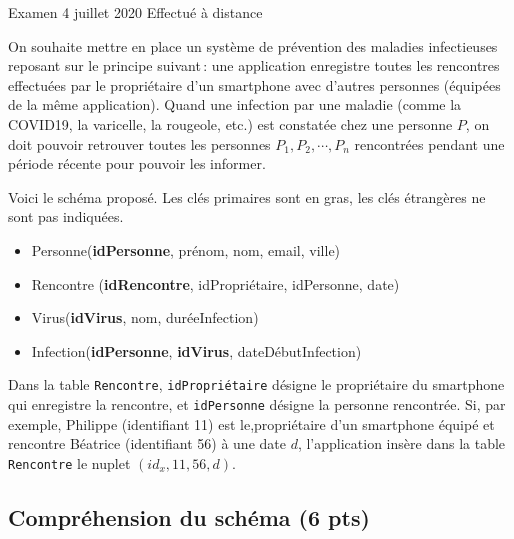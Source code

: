 %
{Examen 4 juillet 2020}%
{Effectué à distance}%

On souhaite mettre en place un système de prévention des maladies infectieuses
reposant sur le principe suivant\,: une application  
enregistre toutes les rencontres effectuées par le propriétaire
d'un smartphone avec d'autres personnes (équipées de la même application). 
Quand une infection par une maladie (comme la COVID19, la  varicelle, la rougeole, etc.)
est constatée chez une personne $P$, on doit pouvoir retrouver toutes  les
personnes $P_1, P_2, \cdots, P_n$ rencontrées pendant une période récente pour pouvoir
les informer.

Voici le schéma proposé. Les clés primaires sont en gras, les clés étrangères ne sont pas indiquées.

\begin{itemize}
\item Personne(\textbf{idPersonne},  prénom, nom, email, ville)
\item Rencontre (\textbf{idRencontre}, idPropriétaire, idPersonne, date)
\item Virus(\textbf{idVirus}, nom, duréeInfection)
\item Infection(\textbf{idPersonne}, \textbf{idVirus}, dateDébutInfection)
\end{itemize}

Dans la table \texttt{Rencontre}, \texttt{idPropriétaire} désigne le propriétaire
du smartphone qui enregistre la rencontre, et  \texttt{idPersonne} désigne
la personne rencontrée. Si, par exemple, Philippe (identifiant 11) est le,propriétaire
d'un smartphone équipé et rencontre Béatrice
(identifiant 56) à une date $d$, 
l'application insère dans la table 
\texttt{Rencontre} le nuplet 
$(id_x, 11, 56, d)$.  

\subsection*{Compréhension du schéma (6 pts)}


